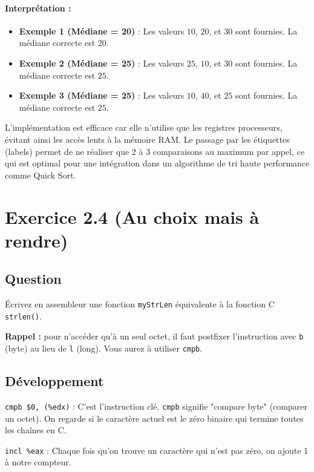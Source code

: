 \paragraph*{Interprétation :}

\begin{itemize}
    \item \textbf{Exemple 1 (Médiane = 20)} : Les valeurs $10$, $20$, et $30$ sont fournies. La médiane correcte est $20$.
    \item \textbf{Exemple 2 (Médiane = 25)} : Les valeurs $25$, $10$, et $30$ sont fournies. La médiane correcte est $25$.
    \item \textbf{Exemple 3 (Médiane = 25)} : Les valeurs $10$, $40$, et $25$ sont fournies. La médiane correcte est $25$.
\end{itemize}

L'implémentation est efficace car elle n'utilise que les registres processeurs, évitant ainsi les accès lents à la mémoire RAM. Le passage par les étiquettes (labels) permet de ne réaliser que 2 à 3 comparaisons au maximum par appel, ce qui est optimal pour une intégration dans un algorithme de tri haute performance comme Quick Sort.

\section{Exercice 2.4 (Au choix mais à rendre)}

\subsection{Question}
Écrivez en assembleur une fonction \texttt{myStrLen} équivalente à la fonction C \texttt{strlen()}.

\textbf{Rappel :} pour n'accéder qu'à un seul octet, il faut postfixer l'instruction avec \texttt{b} (byte) au lieu de \texttt{l} (long). Vous aurez à utiliser \texttt{cmpb}.

\subsection{Développement}
\texttt{cmpb \$0, (\%edx)} : C'est l'instruction clé. \texttt{cmpb} signifie "compare byte" (comparer un octet). On regarde si le caractère actuel est le zéro binaire qui termine toutes les chaînes en C.

\texttt{incl \%eax} : Chaque fois qu'on trouve un caractère qui n'est pas zéro, on ajoute 1 à notre compteur.


